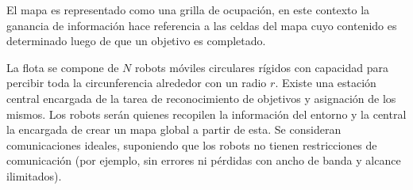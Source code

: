 El mapa es representado como una grilla de ocupación, en este contexto la ganancia de información hace referencia a las celdas del mapa cuyo contenido es determinado luego de que un objetivo es completado. 

La flota se compone de $N$ robots móviles circulares rígidos con capacidad para percibir toda la circunferencia alrededor con un radio $r$. Existe una estación central encargada de la tarea de reconocimiento de objetivos y asignación de los mismos. Los robots serán quienes recopilen la información del entorno y la central la encargada de crear un mapa global a partir de esta. Se consideran comunicaciones ideales, suponiendo que los robots no tienen restricciones de comunicación (por ejemplo, sin errores ni pérdidas con ancho de banda y alcance ilimitados). %

